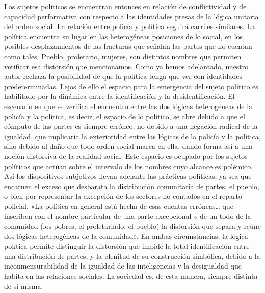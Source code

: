 Los sujetos políticos se encuentran entonces en relación de conflictividad y de capacidad performativa con respecto a las identidades presas de la lógica unitaria del orden social. La relación entre policía y política seguirá carriles similares. La política encuentra su lugar en las heterogéneas posiciones de lo social, en los posibles desplazamientos de las fracturas que señalan las partes que no cuentan como tales. Pueblo, proletario, mujeres, son distintos nombres que permiten verificar esa distorsión que mencionamos. Como ya hemos adelantado, nuestro autor rechaza la posibilidad de que la política tenga que ver con identidades predeterminadas. Lejos de ello el espacio para la emergencia del sujeto político es habilitado por la dinámica entre la identificación y la desidentificación. El escenario en que se verifica el encuentro entre las dos lógicas heterogéneas de la policía y la política, es decir, el espacio de lo político, se abre debido a que el cómputo de las partes es siempre erróneo, no debido a una negación radical de la igualdad, que implicaría la exterioridad entre las lógicas de la policía y la política, sino debido al daño que todo orden social marca en ella, dando forma así a una noción distorsiva de la realidad social. Este espacio es ocupado por los sujetos políticos que actúan sobre el intervalo de los nombres cuyo alcance es polémico. Así los dispositivos subjetivos llevan adelante las prácticas políticas, ya sea que encarnen el exceso que desbarata la distribución comunitaria de partes, el pueblo, o bien por representar la excepción de los sectores no contados en el reparto policial. «La política en general está hecha de esas cuentas erróneas\ldots{} que inscriben con el nombre particular de una parte excepcional \emph{o} de un todo de la comunidad (los pobres, el proletariado, el pueblo) la distorsión que separa y reúne dos lógicas heterogéneas de la comunidad». En ambas circunstancias, la lógica política permite distinguir la distorsión que impide la total identificación entre una distribución de partes, y la plenitud de su construcción simbólica, debido a la inconmensurabilidad de la igualdad de las inteligencias y la desigualdad que habita en las relaciones sociales. La sociedad es, de esta manera, siempre distinta de sí misma.

